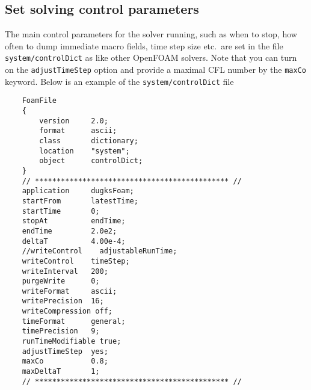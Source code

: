 \subsection{Set solving control parameters}
The main control parameters for the solver running, such as when to stop, how often to dump immediate macro fields, time step size etc.\
are set in the file \verb|system/controlDict| as like other OpenFOAM solvers.
Note that you can turn on the \verb|adjustTimeStep| option and provide a maximal CFL number by the \verb|maxCo| keyword. Below is an example of
the \verb|system/controlDict| file
\begin{verbatim}
    FoamFile
    {
        version     2.0;
        format      ascii;
        class       dictionary;
        location    "system";
        object      controlDict;
    }
    // ********************************************* //
    application     dugksFoam;
    startFrom       latestTime;
    startTime       0;
    stopAt          endTime;
    endTime         2.0e2;
    deltaT          4.00e-4;
    //writeControl    adjustableRunTime;
    writeControl    timeStep;
    writeInterval   200;
    purgeWrite      0;
    writeFormat     ascii;
    writePrecision  16;
    writeCompression off;
    timeFormat      general;
    timePrecision   9;
    runTimeModifiable true;
    adjustTimeStep  yes;
    maxCo           0.8;
    maxDeltaT       1;
    // ********************************************* //
\end{verbatim}

